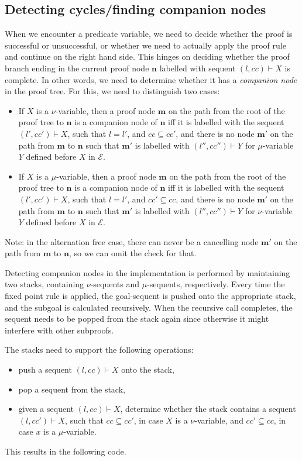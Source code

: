 \documentclass{article}
\newcommand{\loc}{l}
\newcommand{\region}{\mathit{cc}}
\begin{document}
\subsection{Detecting cycles/finding companion nodes}
When we encounter a predicate variable, we need to decide whether the proof is successful or unsuccessful, or whether we need to actually apply the proof rule and continue on the right hand side. This hinges on deciding whether the proof branch ending in the current proof node $\mathbf{n}$ labelled with sequent $(\loc, \region) \vdash X$ is complete. In other words, we need to determine whether it has a \emph{companion node} in the proof tree. For this, we need to distinguish two cases:
\begin{itemize}
  \item If $X$ is a $\nu$-variable, then a proof node $\mathbf{m}$ on the path from the root of the proof tree to $\mathbf{n}$ is a companion node of $\mathbf{n}$ iff it is labelled with the sequent $(\loc', \region') \vdash X$, such that $\loc = \loc'$, and $\region \subseteq \region'$, and there is no node $\mathbf{m'}$ on the path from $\mathbf{m}$ to $\mathbf{n}$ such that $\mathbf{m'}$ is labelled with $(\loc'', \region'') \vdash Y$ for $\mu$-variable $Y$ defined before $X$ in $\mathcal{E}$.
  \item If $X$ is a $\mu$-variable, then a proof node $\mathbf{m}$ on the path from the root of the proof tree to $\mathbf{n}$ is a companion node of $\mathbf{n}$ iff it is labelled with the sequent $(\loc', \region') \vdash X$, such that $\loc = \loc'$, and $\region' \subseteq \region$, and there is no node $\mathbf{m'}$ on the path from $\mathbf{m}$ to $\mathbf{n}$ such that $\mathbf{m'}$ is labelled with $(\loc'', \region'') \vdash Y$ for $\nu$-variable $Y$ defined before $X$ in $\mathcal{E}$.
\end{itemize}
Note: in the alternation free case, there can never be a cancelling node $\mathbf{m'}$ on the path from $\mathbf{m}$ to $\mathbf{n}$, so we can omit the check for that.

Detecting companion nodes in the implementation is performed by maintaining two stacks, containing $\nu$-sequents and $\mu$-sequents, respectively. Every time the fixed point rule is applied, the goal-sequent is pushed onto the appropriate stack, and the subgoal is calculated recursively. When the recursive call completes, the sequent needs to be popped from the stack again since otherwise it might interfere with other subproofs.

The stacks need to support the following operations:
\begin{itemize}
  \item push a sequent $(\loc, \region) \vdash X$ onto the stack,
  \item pop a sequent from the stack,
  \item given a sequent $(\loc, \region) \vdash X$, determine whether the stack contains a sequent $(\loc, \region') \vdash X$, such that $\region \subseteq \region'$, in case $X$ is a $\nu$-variable, and $\region' \subseteq \region$, in case $x$ is a $\mu$-variable.
\end{itemize}
This results in the following code.
\end{document}
